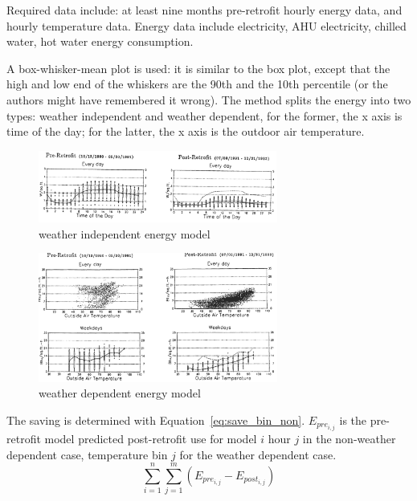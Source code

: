 \documentclass[12pt]{article}
\newcommand{\eref}[1]{Equation~\ref{#1}}
\begin{document}

Required data include: at least nine months pre-retrofit hourly energy
data, and hourly temperature data. Energy data include electricity, AHU
electricity, chilled water, hot water energy consumption.

A box-whisker-mean plot is used: it is similar to the box plot, except
that the high and low end of the whiskers are the 90th and the 10th
percentile (or the authors might have remembered it wrong).  The
method splits the energy into two types: weather independent and
weather dependent, for the former, the x axis is time of the day; for
the latter, the x axis is the outdoor air temperature.

\begin{figure}[h!]
  \centering
  \includegraphics[width=0.7\textwidth]{images/weather_independent.png}
  \caption{weather independent energy model}
  \label{fig:weather_independent}
\end{figure}
\begin{figure}[h!]
  \centering
  \includegraphics[width=0.7\textwidth]{images/weather_dependent.png}
  \caption{weather dependent energy model}
  \label{fig:weather_dependent}
\end{figure}
\FloatBarrier

The saving is determined with \eref{eq:save_bin_non}.
$E_{pre_{i, j}}$ is the pre-retrofit model predicted post-retrofit use
for model $i$ hour $j$ in the non-weather dependent case, temperature
bin $j$ for the weather dependent case.
\begin{equation}
  \label{eq:save_bin_non}
  \sum_{i = 1}^n\sum_{j = 1}^m (E_{pre_{i, j}} - E_{post_{i, j}})
\end{equation}
\end{document}
